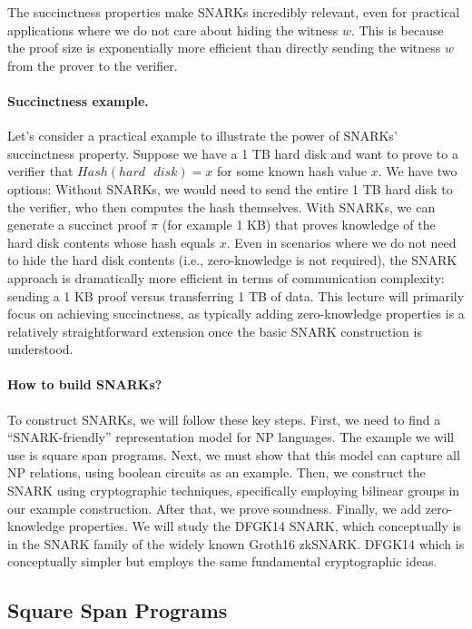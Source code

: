 The succinctness properties make SNARKs incredibly relevant, even for practical applications where we do not care about hiding the witness $w$. This is because the proof size is exponentially more efficient than directly sending the witness $w$ from the prover to the verifier.

\paragraph{Succinctness example.} Let's consider a practical example to illustrate the power of SNARKs' succinctness property. Suppose we have a 1 TB hard disk and want to prove to a verifier that $Hash(hard\text{ }disk) = x$ for some known hash value $x$. We have two options: Without SNARKs, we would need to send the entire 1 TB hard disk to the verifier, who then computes the hash themselves. With SNARKs, we can generate a succinct proof $\pi$ (for example 1 KB) that proves knowledge of the hard disk contents whose hash equals $x$. Even in scenarios where we do not need to hide the hard disk contents (i.e., zero-knowledge is not required), the SNARK approach is dramatically more efficient in terms of communication complexity: sending a 1 KB proof versus transferring 1 TB of data. This lecture will primarily focus on achieving succinctness, as typically adding zero-knowledge properties is a relatively straightforward extension once the basic SNARK construction is understood.

\paragraph{How to build SNARKs?} To construct SNARKs, we will follow these key steps. First, we need to find a ``SNARK-friendly'' representation model for NP languages. The example we will use is square span programs. Next, we must show that this model can capture all NP relations, using boolean circuits as an example. Then, we construct the SNARK using cryptographic techniques, specifically employing bilinear groups in our example construction. After that, we prove soundness. Finally, we add zero-knowledge properties. We will study the DFGK14 SNARK, which conceptually is in the SNARK family of the widely known Groth16 zkSNARK. DFGK14 which is conceptually simpler but employs the same fundamental cryptographic ideas.

\subsection{Square Span Programs}

